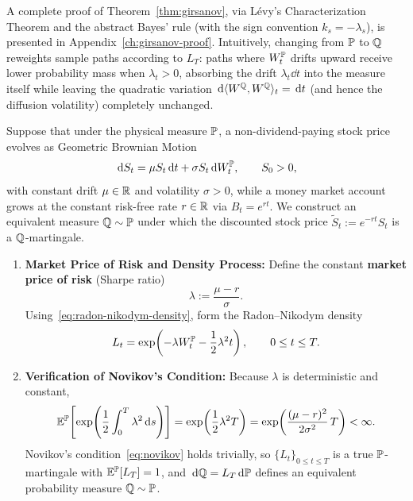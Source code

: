 A complete proof of Theorem~\ref{thm:girsanov}, via L\'evy's Characterization Theorem and the abstract Bayes' rule (with the sign convention $k_s = -\lambda_s$), is presented in Appendix~\ref{ch:girsanov-proof}. Intuitively, changing from $\mathbb{P}$ to $\mathbb{Q}$ reweights sample paths according to $L_T$: paths where $W_t^{\mathbb{P}}$ drifts upward receive lower probability mass when $\lambda_t > 0$, absorbing the drift $\lambda_t \dd t$ into the measure itself while leaving the quadratic variation $\,\mathrm{d}\langle W^{\mathbb{Q}}, W^{\mathbb{Q}} \rangle_t = \,\mathrm{d} t$ (and hence the diffusion volatility) completely unchanged.

\begin{example}
\label{ex:girsanov-drift-shift}
Suppose that under the physical measure $\mathbb{P}$, a non-dividend-paying stock price evolves as Geometric Brownian Motion
\[
\,\mathrm{d} S_t = \mu S_t \,\mathrm{d} t + \sigma S_t \,\mathrm{d} W_t^{\mathbb{P}}, \qquad S_0 > 0,
\]
with constant drift $\mu \in \mathbb{R}$ and volatility $\sigma > 0$, while a money market account grows at the constant risk-free rate $r \in \mathbb{R}$ via $B_t = e^{rt}$. We construct an equivalent measure $\mathbb{Q} \sim \mathbb{P}$ under which the discounted stock price $\widetilde{S}_t := e^{-rt} S_t$ is a $\mathbb{Q}$-martingale.

\begin{enumerate}
    \item \textbf{Market Price of Risk and Density Process:} Define the constant \textbf{market price of risk} (Sharpe ratio)
    \[
    \lambda := \frac{\mu - r}{\sigma}.
    \]
    Using~\eqref{eq:radon-nikodym-density}, form the Radon--Nikodym density
    \[
    L_t = \exp\!\left(-\lambda W_t^{\mathbb{P}} - \frac{1}{2}\lambda^2 t\right), \qquad 0 \le t \le T.
    \]

    \item \textbf{Verification of Novikov's Condition:} Because $\lambda$ is deterministic and constant,
    \[
    \mathbb{E}^{\mathbb{P}}\!\left[\exp\!\left(\frac{1}{2}\int_0^T \lambda^2 \,\mathrm{d} s\right)\right] = \exp\!\left(\frac{1}{2}\lambda^2 T\right) = \exp\!\left(\frac{(\mu - r)^2}{2\sigma^2}\,T\right) < \infty.
    \]
    Novikov's condition~\eqref{eq:novikov} holds trivially, so $\{L_t\}_{0 \le t \le T}$ is a true $\mathbb{P}$-martingale with $\mathbb{E}^{\mathbb{P}}[L_T] = 1$, and $\,\mathrm{d}\mathbb{Q} = L_T \,\mathrm{d}\mathbb{P}$ defines an equivalent probability measure $\mathbb{Q} \sim \mathbb{P}$.


\end{enumerate}
\end{example}

